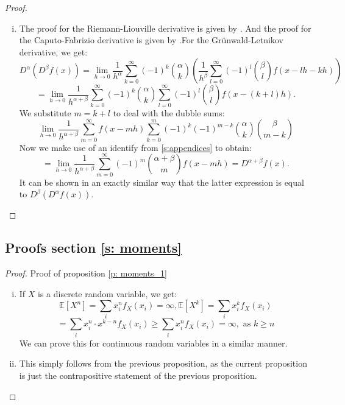 \begin{proof}
\begin{enumerate}[(i)]
        \item The proof for the Riemann-Liouville derivative is given by \cite{koning15}. And the proof for the Caputo-Fabrizio derivative is given by \cite{losada15}.For the Grünwald-Letnikov derivative, we get:
        \[ D^\alpha(D^\beta f(x)) = \lim_{h \to 0} \frac{1}{h^\alpha} \sum_{k=0}^\infty (-1)^k \binom{\alpha}{k}(  \frac{1}{h^\beta} \sum_{l=0}^\infty (-1)^l \binom{\beta}{l} f(x - l h - kh))\]
        \[= \lim_{h \to 0} \frac{1}{h^{\alpha + \beta}} \sum_{k=0}^\infty (-1)^k \binom{\alpha}{k} \sum_{l=0}^\infty (-1)^l \binom{\beta}{l} f(x - (k + l)h).\] We substitute \(m = k + l\) to deal with the dubble sums: 
        \[ \lim_{h \to 0} \frac{1}{h^{\alpha + \beta}} \sum_{m=0}^\infty f(x - mh)  \sum_{k=0}^m (-1)^k (-1)^{ m - k} \binom{\alpha}{k} \binom{\beta}{m - k}\] Now we make use of an identify from \autoref{s:appendices} to obtain:
        \[ = \lim_{h \to 0} \frac{1}{h^{\alpha + \beta}} \sum_{m=0}^\infty (-1)^m \binom{\alpha + \beta}{m} f(x - mh) = D^{\alpha + \beta} f(x).\]
        It can be shown in an exactly similar way that the latter expression is equal to \(D^\beta(D^\alpha f(x))\).

        
    \end{enumerate}
\end{proof}

\subsection{Proofs section \ref{s: moments}}

\begin{proof}
    Proof of proposition \ref{p: moments_1}
     
    \begin{enumerate}[(i)]
        \item If \(X\) is a discrete random variable, we get: \[\mathbb{E}[X^n] = \sum_{i} x_i^n f_X(x_i) = \infty, \mathbb{E}[X^k] = \sum_{i} x_i^k f_X(x_i)\]
        \[ = \sum_{i} x_i^n \cdot x^{k - n} f_X(x_i) \geq \sum_{i} x_i^n f_X(x_i) = \infty, \text{ as } k \geq n\]
        We can prove this for continuous random variables in a similar manner.
        \item This simply follows from the previous proposition, as the current proposition is just the contrapositive statement of the previous proposition.
    \end{enumerate}
\end{proof}

